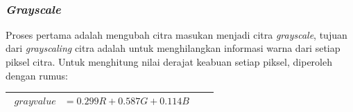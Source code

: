 \begin{adjustbox}{width=1\textwidth}
	\noindent\begin{minipage}{\linewidth}
		\label{fig:SkemaAlurPendeteksianPlat}
	\end{minipage}
\end{adjustbox}\\

\subsubsection{\textit{Grayscale}}
\noindent Proses pertama adalah mengubah citra masukan menjadi citra \textit{grayscale}, tujuan dari \textit{grayscaling} citra adalah untuk menghilangkan informasi warna dari setiap piksel citra. Untuk menghitung nilai derajat keabuan setiap piksel, diperoleh dengan rumus:

\begin{table}[H]
	\begin{adjustbox}{width=1\textwidth}
		\begin{tabular}{|p{13.55cm}|}
			\hline
			\begin{equation}\nonumber
			\begin{aligned}
			\textit{grayvalue} 	&= 0.299 R + 0.587 G + 0.114 B&& \\
			\end{aligned}
			\end{equation}\\
			\hline
		\end{tabular}
	\end{adjustbox}
	\label{fig:PersamaanGrayscale}
\end{table}


